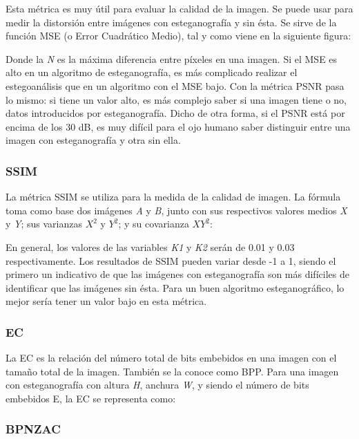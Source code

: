 Esta métrica es muy útil para evaluar la calidad de la imagen. Se puede usar para medir la distorsión entre imágenes con esteganografía y sin ésta. Se sirve de la función \ac{MSE} (o Error Cuadrático Medio), tal y como viene en la siguiente figura: %




Donde la \textit{N} es la máxima diferencia entre píxeles en una imagen. Si el \ac{MSE} es alto en un algoritmo de esteganografía, es más complicado realizar el estegoanálisis que en un algoritmo con el \ac{MSE} bajo. Con la métrica \ac{PSNR} pasa lo mismo: si tiene un valor alto, es más complejo saber si una imagen tiene o no, datos introducidos por esteganografía. Dicho de otra forma, si el \ac{PSNR} está por encima de los 30 dB, es muy difícil para el ojo humano saber distinguir entre una imagen con esteganografía y otra sin ella.

\subsubsection{SSIM}

La métrica \ac{SSIM} se utiliza para la medida de la calidad de imagen. La fórmula toma como base dos imágenes \textit{A} y \textit{B}, junto con sus respectivos valores medios \textit{X} y \textit{Y}; sus varianzas $X^{2}$ y $Y^{2}$; y su covarianza $XY^{2}$:


En general, los valores de las variables \textit{K1} y \textit{K2} serán de 0.01 y 0.03 respectivamente. Los resultados de \ac{SSIM} pueden variar desde -1 a 1, siendo el primero un indicativo de que las imágenes con esteganografía son más difíciles de identificar que las imágenes sin ésta. Para un buen algoritmo esteganográfico, lo mejor sería tener un valor bajo en esta métrica.

\subsubsection{EC}

La \ac{EC} es la relación del número total de bits embebidos en una imagen con el tamaño total de la imagen. También se la conoce como \ac{BPP}. Para una imagen con esteganografía con altura \textit{H}, anchura \textit{W}, y siendo el número de bits embebidos \ac{E}, la \ac{EC} se representa como:


\subsubsection{BPNZAC}

